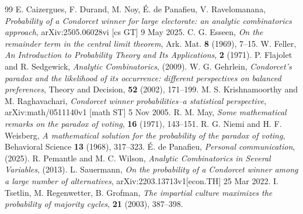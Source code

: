 \documentclass[11pt]{amsart}
\theoremstyle{remark}
\numberwithin{equation}{section}
\begin{document}
\begin{thebibliography}{99}
E. Caizergues, F. Durand, M. Noy, \'E. de Panafieu, V. Ravelomanana, \textit{Probability of a Condorcet winner for large electorate: an analytic combinatorics approach}, arXiv:2505.06028vi [cs GT] 9 May 2025.
C. G. Esseen, \textit{On the remainder term in the central limit theorem}, Ark. Mat. {\bf 8\/} (1969), 7--15.
W. Feller, \textit{An Introduction to Probability Theory and Its Applications}, {\bf 2} (1971).
P. Flajolet and R. Sedgewick, \textit{Analytic Combinatorics}, (2009).
W. G. Gehrlein, \textit{Condorcet's paradox and the likelihood of its occurrence: different perspectives on balanced preferences}, 
Theory and Decision, {\bf 52} (2002), 171--199.
M. S. Krishnamoorthy and M. Raghavachari, \textit{Condorcet winner probabilities--a statistical perspective}, arXiv:math/0511140v1 [math ST] 5 Nov 2005.
R. M. May, \textit{Some mathematical remarks on the paradox of voting}, {\bf 16} (1971), 143--151.
R. G. Niemi and H. F. Weisberg, \textit{A mathematical solution for the probability of the paradox of voting}, Behavioral Science {\bf 13}
(1968), 317--323.
 \'E. de Panafieu, \textit{Personal communication}, (2025).
R. Pemantle and M. C. Wilson, \textit{Analytic Combinatorics in Several Variables}, (2013).
L. Sauermann, \textit{On the probability of a Condorcet winner among a large number of alternatives}, arXiv:2203.13713v1[econ.TH] 25 Mar 2022.
I. Tsetlin, M. Regenwetter, B. Grofman, \textit{The impartial culture maximizes the probability of majority cycles},
{\bf 21} (2003), 387--398.
\end{thebibliography}
\end{document}
